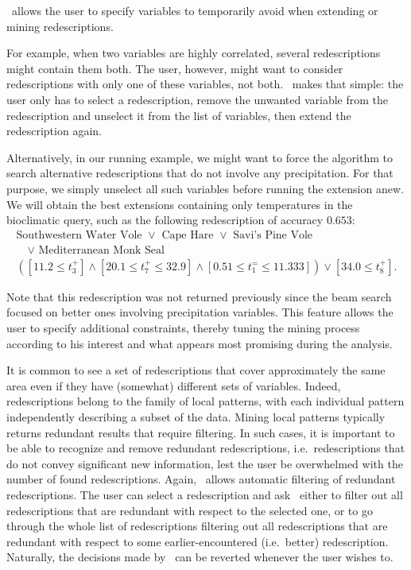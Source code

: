 \Siren\ allows the user to specify variables to temporarily 
avoid when extending or mining redescriptions.

For example, when two variables are highly
correlated, several redescriptions might contain them
both. The user, however, might want to consider
redescriptions with only one of these variables, not
both. \Siren\ makes that simple: the user only has to select a
redescription, remove the unwanted variable from the
redescription and unselect it from the list of variables, then extend the
redescription again. 

Alternatively, in our running example, we might want to force the
algorithm to search alternative redescriptions that do not involve any
 precipitation. For that purpose, we simply unselect all such
variables before running the extension anew. We will obtain the best
extensions containing only temperatures in the bioclimatic query, such
as the following redescription of accuracy $0.653$:
\begin{equation*}
\begin{array}{l}
\text{Southwestern Water Vole }\lor\text{ Cape Hare }\lor\text{ Savi's Pine Vole }\\[1mm]
\quad\lor\text{ Mediterranean Monk Seal}\\[3mm]
( [11.2 \leq t_{3}^{+}] \land  [20.1 \leq t_{7}^{+} \leq 32.9] %
\land  [0.51 \leq t_{1}^{=} \leq 11.333]) \lor  [34.0 \leq t_{8}^{+}].
\end{array}
\end{equation*}

Note that this redescription was not returned previously since the
beam search focused on better ones involving precipitation variables.
This feature allows the user to specify additional constraints, thereby tuning the mining process according to his interest and what appears most promising during the analysis.

\label{sec:filt-redund-redescr}
It is common to see a set of redescriptions that cover approximately
the same area even if they have (somewhat) different sets of
variables.  Indeed, redescriptions belong to the family of local
patterns, with each individual pattern independently describing a
subset of the data. Mining local patterns typically returns redundant
results that require filtering.  In such cases, it is important to be
able to recognize and remove redundant redescriptions, i.e.\
redescriptions that do not convey significant new information, lest
the user be overwhelmed with the number of found
redescriptions. Again, \Siren\ allows automatic filtering of redundant
redescriptions. The user can select a redescription and ask
\Siren\ either to filter out all redescriptions that are redundant
with respect to the selected one, or to go through the whole list of
redescriptions filtering out all redescriptions that are redundant
with respect to some earlier-encountered (i.e.\ better)
redescription. Naturally, the decisions made by
\Siren\ can be reverted whenever the user wishes to.

